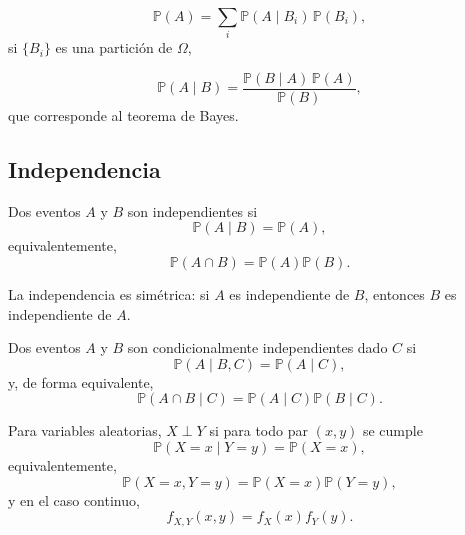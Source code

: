 \documentclass[12pt]{report} %
\begin{document}
\begin{equation}
    \mathbb{P}(A)=\sum_i \mathbb{P}(A\mid B_i)\,\mathbb{P}(B_i),
    \label{eq:total_probability_rule}
\end{equation}
si $\{B_i\}$ es una partición de $\Omega$,

\begin{equation}
    \mathbb{P}(A\mid B)=\frac{\mathbb{P}(B\mid A)\,\mathbb{P}(A)}{\mathbb{P}(B)},
    \label{eq:bayes_rule}
\end{equation}
que corresponde al teorema de Bayes.

\subsection{Independencia}

Dos eventos $A$ y $B$ son independientes si
\begin{equation}
    \mathbb{P}(A\mid B)=\mathbb{P}(A),
    \label{eq:event_independence_conditional}
\end{equation}
equivalentemente,
\begin{equation}
    \mathbb{P}(A\cap B)=\mathbb{P}(A)\mathbb{P}(B).
    \label{eq:event_independence_product}
\end{equation}

La independencia es simétrica: si $A$ es independiente de $B$, entonces $B$ es independiente de $A$.

Dos eventos $A$ y $B$ son condicionalmente independientes dado $C$ si
\begin{equation}
    \mathbb{P}(A\mid B,C)=\mathbb{P}(A\mid C),
    \label{eq:conditional_independence_events}
\end{equation}
y, de forma equivalente,
\begin{equation}
    \mathbb{P}(A\cap B\mid C)=\mathbb{P}(A\mid C)\mathbb{P}(B\mid C).
    \label{eq:conditional_independence_factorization}
\end{equation}

Para variables aleatorias, $X \perp Y$ si para todo par $(x,y)$ se cumple
\begin{equation}
    \mathbb{P}(X=x\mid Y=y)=\mathbb{P}(X=x),
    \label{eq:variable_independence_conditional}
\end{equation}
equivalentemente,
\begin{equation}
    \mathbb{P}(X=x,Y=y)=\mathbb{P}(X=x)\mathbb{P}(Y=y),
    \label{eq:variable_independence_joint_factorization}
\end{equation}
y en el caso continuo,
$$
    f_{X,Y}(x,y)=f_X(x)f_Y(y).
$$
\end{document}
